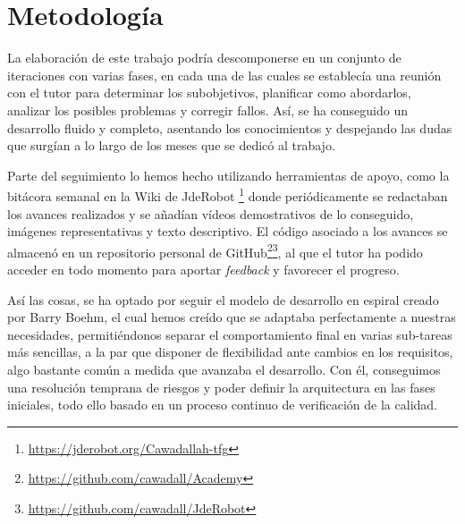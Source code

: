 \section{Metodología}
La elaboración de este trabajo podría descomponerse en un conjunto de iteraciones con varias fases, en cada una de las cuales se establecía una reunión con el tutor para determinar los subobjetivos, planificar como abordarlos, analizar los posibles problemas y corregir fallos. Así, se ha conseguido un desarrollo fluido y completo, asentando los conocimientos y despejando las dudas que surgían a lo largo de los meses que se dedicó al trabajo.

Parte del seguimiento lo hemos hecho utilizando herramientas de apoyo, como la bitácora semanal en la Wiki de JdeRobot \footnote{\url{https://jderobot.org/Cawadallah-tfg}} donde periódicamente se redactaban los avances realizados y se añadían vídeos demostrativos de lo conseguido, imágenes representativas y texto descriptivo. El código asociado a los avances se almacenó en un repositorio personal de GitHub\footnote{\url{https://github.com/cawadall/Academy}}\footnote{\url{https://github.com/cawadall/JdeRobot}}, al que el tutor ha podido acceder en todo momento para aportar \textit{feedback} y favorecer el progreso.

Así las cosas, se ha optado por seguir el modelo de desarrollo en espiral creado por Barry Boehm, el cual hemos creído que se adaptaba perfectamente a nuestras necesidades, permitiéndonos separar el comportamiento final en varias sub-tareas más sencillas, a la par que disponer de flexibilidad ante cambios en los requisitos, algo bastante común a medida que avanzaba el desarrollo. Con él, conseguimos una resolución temprana de riesgos y poder definir la arquitectura en las fases iniciales, todo ello basado en un proceso continuo de verificación de la calidad.


